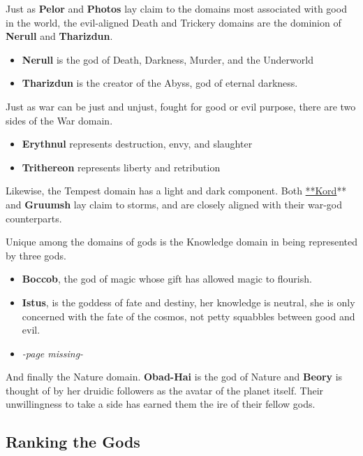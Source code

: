 \documentclass[smalldemyvopaper,11pt,twoside,onecolumn,openright,extrafontsizes]{memoir}
\begin{document}
Just as \textbf{Pelor} and \textbf{Photos} lay claim to the domains most
associated with good in the world, the evil-aligned Death and Trickery
domains are the dominion of \textbf{Nerull} and \textbf{Tharizdun}.

\begin{itemize}
\tightlist
\item
  \textbf{Nerull} is the god of Death, Darkness, Murder, and the
  Underworld
\item
  \textbf{Tharizdun} is the creator of the Abyss, god of eternal
  darkness.
\end{itemize}

Just as war can be just and unjust, fought for good or evil purpose,
there are two sides of the War domain.

\begin{itemize}
\tightlist
\item
  \textbf{Erythnul} represents destruction, envy, and slaughter
\item
  \textbf{Trithereon} represents liberty and retribution
\end{itemize}

Likewise, the Tempest domain has a light and dark component. Both
\href{/characters/kord/}{**Kord}** and \textbf{Gruumsh} lay claim to
storms, and are closely aligned with their war-god counterparts.

Unique among the domains of gods is the Knowledge domain in being
represented by three gods.

\begin{itemize}
\tightlist
\item
  \textbf{Boccob}, the god of magic whose gift has allowed magic to
  flourish.
\item
  \textbf{Istus}, is the goddess of fate and destiny, her knowledge is
  neutral, she is only concerned with the fate of the cosmos, not petty
  squabbles between good and evil.
\item
  \emph{-page missing-}
\end{itemize}

And finally the Nature domain. \textbf{Obad-Hai} is the god of Nature
and \textbf{Beory} is thought of by her druidic followers as the avatar
of the planet itself. Their unwillingness to take a side has earned them
the ire of their fellow gods.

\hypertarget{ranking-the-gods}{%
\subsection{Ranking the Gods}\label{ranking-the-gods}}
\end{document}
